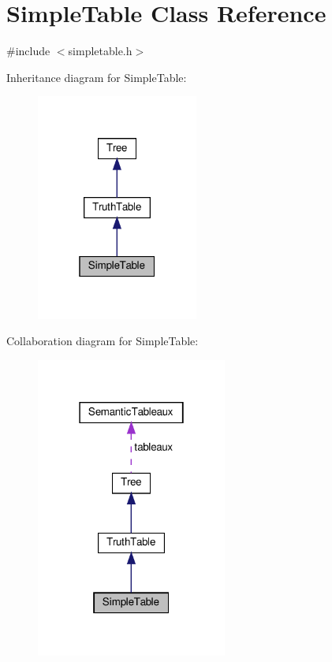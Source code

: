 \hypertarget{class_simple_table}{}\section{Simple\+Table Class Reference}
\label{class_simple_table}


{\ttfamily \#include $<$simpletable.\+h$>$}



Inheritance diagram for Simple\+Table\+:\nopagebreak
\begin{figure}[H]
\begin{center}
\leavevmode
\includegraphics[width=151pt]{db/d9f/class_simple_table__inherit__graph}
\end{center}
\end{figure}


Collaboration diagram for Simple\+Table\+:\nopagebreak
\begin{figure}[H]
\begin{center}
\leavevmode
\includegraphics[width=178pt]{db/d30/class_simple_table__coll__graph}
\end{center}
\end{figure}
